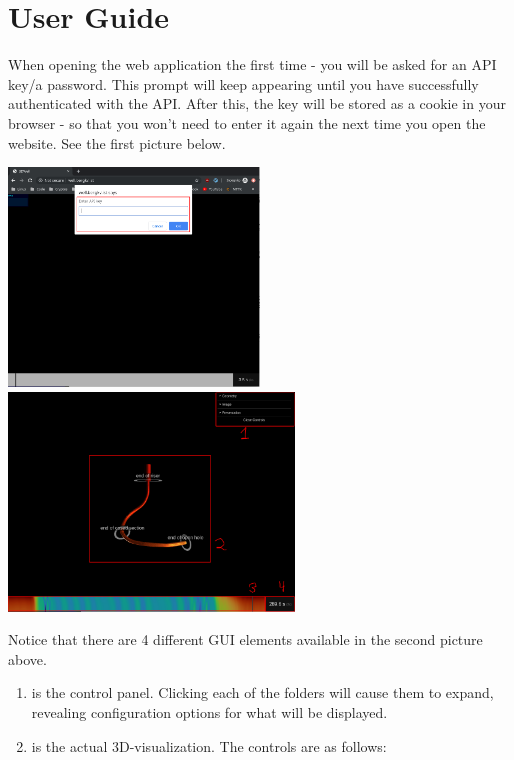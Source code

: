 \hypertarget{user-guide}{%
\section{User Guide}\label{user-guide}}

When opening the web application the first time - you will be asked for
an API key/a password. This prompt will keep appearing until you have
successfully authenticated with the API. After this, the key will be
stored as a cookie in your browser - so that you won't need to enter it
again the next time you open the website. See the first picture below.

\includegraphics[width=\textwidth,height=2.29167in]{./auth.png}
\includegraphics[width=\textwidth,height=2.29167in]{./overview.png}

Notice that there are 4 different GUI elements available in the second
picture above.

\begin{enumerate}
\def\labelenumi{\arabic{enumi}.}
\item
  is the control panel. Clicking each of the folders will cause them to
  expand, revealing configuration options for what will be displayed.
\item
  is the actual 3D-visualization. The controls are as follows:
\end{enumerate}

